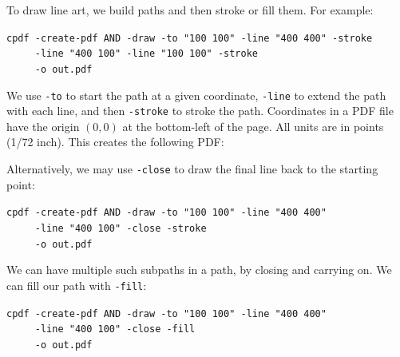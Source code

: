 \documentclass{book}
\begin{document}
\noindent  To draw line art, we build paths and then stroke or fill them. For example:

\begin{framed}
 \noindent\small\verb?cpdf -create-pdf AND -draw -to "100 100" -line "400 400" -stroke?\\
 \noindent\small\verb?     -line "400 100" -line "100 100" -stroke?\\
 \noindent\small\verb?     -o out.pdf?
\end{framed}

\noindent We use \texttt{-to} to start the path at a given coordinate, \texttt{-line} to extend the path with each line, and then \texttt{-stroke} to stroke the path. Coordinates in a PDF file have the origin $(0, 0)$ at the bottom-left of the page. All units are in points (1/72 inch). This creates the following PDF:

\bigskip
{}
\bigskip

\noindent Alternatively, we may use \texttt{-close} to draw the final line back to the starting point:

\begin{framed}
 \noindent\small\verb?cpdf -create-pdf AND -draw -to "100 100" -line "400 400"?\\
 \noindent\small\verb?     -line "400 100" -close -stroke?\\
 \noindent\small\verb?     -o out.pdf?
\end{framed}

\noindent We can have multiple such subpaths in a path, by closing and carrying on. We can fill our path with \texttt{-fill}:

\begin{framed}
 \noindent\small\verb?cpdf -create-pdf AND -draw -to "100 100" -line "400 400"?\\
 \noindent\small\verb?     -line "400 100" -close -fill?\\
 \noindent\small\verb?     -o out.pdf?
\end{framed}
\end{document}
